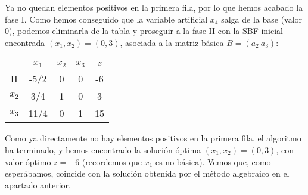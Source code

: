 \documentclass[11pt,a4paper]{article}
\begin{document}
Ya no quedan elementos positivos en la primera fila, por lo que hemos acabado la fase I. Como hemos conseguido que la variable artificial $x_4$ salga de la base (valor $0$), podemos eliminarla de la tabla y proseguir a la fase II con la SBF inicial encontrada $(x_1, x_2)=(0, 3)$, asociada a la matriz básica $B=(a_2 \ a_3)$:

\begin{table}[h!]
  \centering
  \begin{tabular}{c|ccc|c}
    & $x_1$ & $x_2$ & $x_3$ & $z$\\
    \hline
    II & -5/2 & 0 & 0 & {\color{blue}-6}\\
    \hline
    $x_2$ & 3/4 & 1 & 0 & {\color{blue}3}\\
    $x_3$ & 11/4 & 0 & 1 & 15
  \end{tabular}
\end{table}

Como ya directamente no hay elementos positivos en la primera fila, el algoritmo ha terminado, y hemos encontrado la solución óptima $(x_1, x_2)=(0, 3)$, con valor óptimo $z=-6$ (recordemos que $x_1$ es no básica). Vemos que, como esperábamos, coincide con la solución obtenida por el método algebraico en el apartado anterior.
\end{document}
